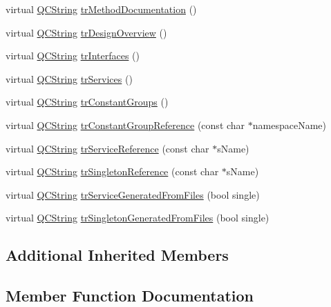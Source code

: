 \begin{DoxyCompactItemize}
\item 
virtual \mbox{\hyperlink{class_q_c_string}{Q\+C\+String}} \mbox{\hyperlink{class_translator_slovak_a5a636c2bbe0fe14640d4e0f8be2f91c6}{tr\+Method\+Documentation}} ()
\item 
virtual \mbox{\hyperlink{class_q_c_string}{Q\+C\+String}} \mbox{\hyperlink{class_translator_slovak_af6d3551443e34355a52d196c826af1df}{tr\+Design\+Overview}} ()
\item 
virtual \mbox{\hyperlink{class_q_c_string}{Q\+C\+String}} \mbox{\hyperlink{class_translator_slovak_a7ee75ce63e4e59ca0108f3bc4eae0ab8}{tr\+Interfaces}} ()
\item 
virtual \mbox{\hyperlink{class_q_c_string}{Q\+C\+String}} \mbox{\hyperlink{class_translator_slovak_a80651df2c215554755886c5f7cb75df8}{tr\+Services}} ()
\item 
virtual \mbox{\hyperlink{class_q_c_string}{Q\+C\+String}} \mbox{\hyperlink{class_translator_slovak_ac2d6a45f622265a45c2575ed0c859e6a}{tr\+Constant\+Groups}} ()
\item 
virtual \mbox{\hyperlink{class_q_c_string}{Q\+C\+String}} \mbox{\hyperlink{class_translator_slovak_a5d185eed5094fd3f6efc999d7ce31da6}{tr\+Constant\+Group\+Reference}} (const char $\ast$namespace\+Name)
\item 
virtual \mbox{\hyperlink{class_q_c_string}{Q\+C\+String}} \mbox{\hyperlink{class_translator_slovak_a2894e1ee715c53aff527fc7ea55e56f3}{tr\+Service\+Reference}} (const char $\ast$s\+Name)
\item 
virtual \mbox{\hyperlink{class_q_c_string}{Q\+C\+String}} \mbox{\hyperlink{class_translator_slovak_aec962f85adc32f538f933f0a9411de09}{tr\+Singleton\+Reference}} (const char $\ast$s\+Name)
\item 
virtual \mbox{\hyperlink{class_q_c_string}{Q\+C\+String}} \mbox{\hyperlink{class_translator_slovak_a576fca16e73315ad769a601f8652d000}{tr\+Service\+Generated\+From\+Files}} (bool single)
\item 
virtual \mbox{\hyperlink{class_q_c_string}{Q\+C\+String}} \mbox{\hyperlink{class_translator_slovak_a35ca111053cc9b953ca969356dec81af}{tr\+Singleton\+Generated\+From\+Files}} (bool single)
\end{DoxyCompactItemize}
\subsection*{Additional Inherited Members}


\subsection{Member Function Documentation}
\mbox{\label{class_translator_slovak_a9de078b3122fe287d5716768249838f0}} 
